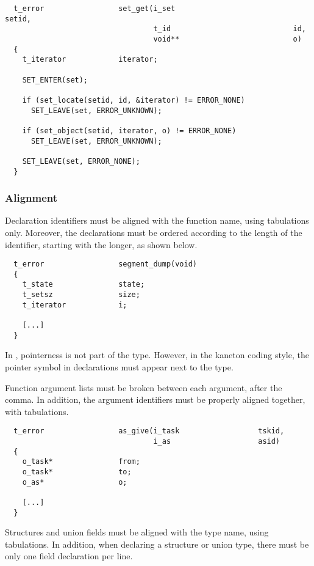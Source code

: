 \begin{verbatim}
  t_error                 set_get(i_set                           setid,
                                  t_id                            id,
                                  void**                          o)
  {
    t_iterator            iterator;

    SET_ENTER(set);

    if (set_locate(setid, id, &iterator) != ERROR_NONE)
      SET_LEAVE(set, ERROR_UNKNOWN);

    if (set_object(setid, iterator, o) != ERROR_NONE)
      SET_LEAVE(set, ERROR_UNKNOWN);

    SET_LEAVE(set, ERROR_NONE);
  }
\end{verbatim}


\subsubsection{Alignment}

Declaration identifiers must be aligned with the function name, using
tabulations only. Moreover, the declarations must be ordered according
to the length of the identifier, starting with the longer, as shown below.

\begin{verbatim}
  t_error                 segment_dump(void)
  {
    t_state               state;
    t_setsz               size;
    t_iterator            i;

    [...]
  }
\end{verbatim}

In , pointerness is not part of the type. However, in the kaneton
coding style, the \code{*} pointer symbol in declarations must appear next
to the type.

Function argument lists must be broken between each argument, after the
comma. In addition, the argument identifiers must be properly aligned
together, with tabulations.

\begin{verbatim}
  t_error                 as_give(i_task                  tskid,
                                  i_as                    asid)
  {
    o_task*               from;
    o_task*               to;
    o_as*                 o;

    [...]
  }
\end{verbatim}

Structures and union fields must be aligned with the type name, using
tabulations. In addition, when declaring a structure or union type, there
must be only one field declaration per line.

